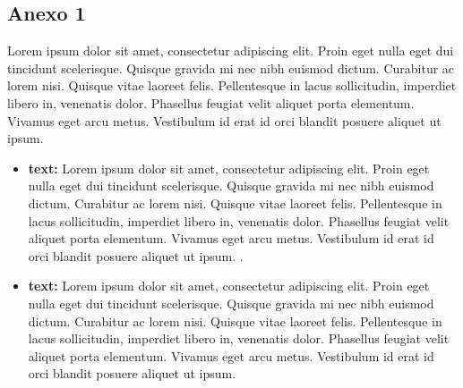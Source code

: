 \subsection{Anexo 1}
Lorem ipsum dolor sit amet, consectetur adipiscing elit. Proin eget nulla eget dui tincidunt scelerisque. Quisque gravida mi nec nibh euismod dictum. Curabitur ac lorem nisi. Quisque vitae laoreet felis. Pellentesque in lacus sollicitudin, imperdiet libero in, venenatis dolor. Phasellus feugiat velit aliquet porta elementum. Vivamus eget arcu metus. Vestibulum id erat id orci blandit posuere aliquet ut ipsum. 


\begin{itemize}
\item \textbf{text:} Lorem ipsum dolor sit amet, consectetur adipiscing elit. Proin eget nulla eget dui tincidunt scelerisque. Quisque gravida mi nec nibh euismod dictum. Curabitur ac lorem nisi. Quisque vitae laoreet felis. Pellentesque in lacus sollicitudin, imperdiet libero in, venenatis dolor. Phasellus feugiat velit aliquet porta elementum. Vivamus eget arcu metus. Vestibulum id erat id orci blandit posuere aliquet ut ipsum. . \\ 
\item \textbf{text:} Lorem ipsum dolor sit amet, consectetur adipiscing elit. Proin eget nulla eget dui tincidunt scelerisque. Quisque gravida mi nec nibh euismod dictum. Curabitur ac lorem nisi. Quisque vitae laoreet felis. Pellentesque in lacus sollicitudin, imperdiet libero in, venenatis dolor. Phasellus feugiat velit aliquet porta elementum. Vivamus eget arcu metus. Vestibulum id erat id orci blandit posuere aliquet ut ipsum. 
\end{itemize}
